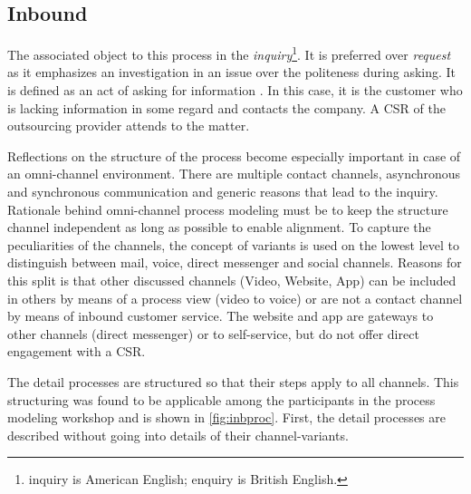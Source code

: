 	\subsection{Inbound}
	The associated object to this process in the \textit{inquiry}\footnote{inquiry is American English; enquiry is British English.}. It is preferred over \textit{request} as it emphasizes an investigation in an issue over the politeness during asking. It is defined as an act of asking for information \citep{oxfordenquiry, oxfordrequest}. In this case, it is the customer who is lacking information in some regard and contacts the company. A \acrshort{CSR} of the outsourcing provider attends to the matter. 
	
	Reflections on the structure of the process become especially important in case of an omni-channel environment. There are multiple contact channels, asynchronous and synchronous communication and generic reasons that lead to the inquiry. Rationale behind omni-channel process modeling must be to keep the structure channel independent as long as possible to enable alignment. To capture the peculiarities of the channels, the concept of variants is used on the lowest level to distinguish between mail, voice, direct messenger and social channels. Reasons for this split is that other discussed channels (Video, Website, App) can be included in others by means of a process view (video to voice) or are not a contact channel by means of inbound customer service. The website and app are gateways to other channels (direct messenger) or to self-service, but do not offer direct engagement with a \acrshort{CSR}. 
	
	The detail processes are structured so that their steps apply to all channels. This structuring was found to be applicable among the participants in the process modeling workshop and is shown in \Fig \ref{fig:inbproc}. First, the detail processes are described without going into details of their channel-variants. 
	
\begin{figure}[caption={Inbound process}, label={fig:inbproc}]
	\begin{center}
\end{center}
\end{figure}

